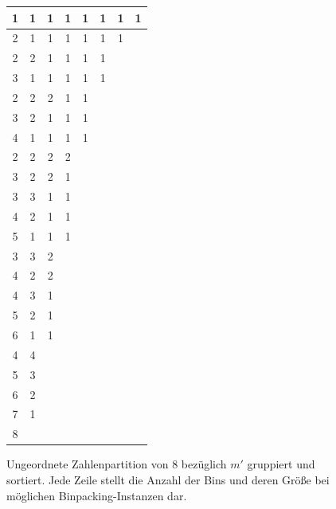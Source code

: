 \documentclass{scrreprt}
\begin{document}
\begin{figure}
    \begin{center}
        \begin{tabular}{cccccccc}
            1 & 1 & 1 & 1 & 1 & 1 & 1 & 1  \\ \hline
            2 & 1 & 1 & 1 & 1 & 1 & 1 & \\ \hline
            2 & 2 & 1 & 1 & 1 & 1 & &\\
            3 & 1 & 1 & 1 & 1 & 1 & &\\ \hline
            2 & 2 & 2 & 1 & 1 & & &\\
            3 & 2 & 1 & 1 & 1 & & &\\
            4 & 1 & 1 & 1 & 1 & & &\\ \hline
            2 & 2 & 2 & 2 & & & &\\
            3 & 2 & 2 & 1 & & & &\\
            3 & 3 & 1 & 1 & & & &\\
            4 & 2 & 1 & 1 & & & &\\
            5 & 1 & 1 & 1 & & & &\\ \hline
            3 & 3 & 2 & & & & &\\
            4 & 2 & 2 & & & & &\\
            4 & 3 & 1 & & & & &\\
            5 & 2 & 1 & & & & &\\
            6 & 1 & 1 & & & & &\\ \hline
            4 & 4 & & & & & &\\
            5 & 3 & & & & & &\\
            6 & 2 & & & & & &\\
            7 & 1 & & & & & &\\ \hline
            8 & & & & & & &
        \end{tabular}
    \end{center}
    \caption{
        \label{abb:binpart}
        Ungeordnete Zahlenpartition von $8$ bezüglich $m'$ gruppiert und sortiert.
        Jede Zeile stellt die Anzahl der Bins und deren Größe bei möglichen Binpacking-Instanzen dar.
    }
\end{figure}
\end{document}
